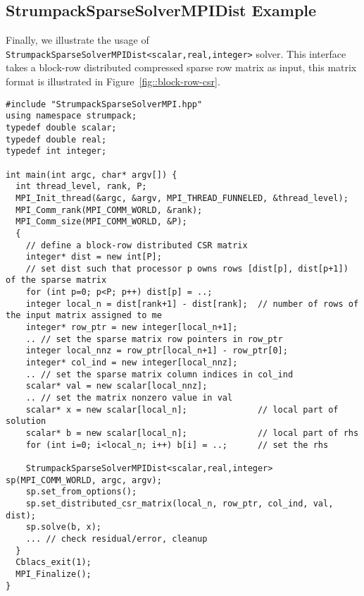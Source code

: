 \documentclass{article}
\begin{document}
\subsection{StrumpackSparseSolverMPIDist Example}
Finally, we illustrate the usage of
\lstinline[style=C]!StrumpackSparseSolverMPIDist<scalar,real,integer>!
solver. This interface takes a block-row distributed compressed sparse
row matrix as input, this matrix format is illustrated in
Figure~\ref{fig::block-row-csr}.
\begin{lstlisting}[style=C]
#include "StrumpackSparseSolverMPI.hpp"
using namespace strumpack;
typedef double scalar;
typedef double real;
typedef int integer;

int main(int argc, char* argv[]) {
  int thread_level, rank, P;
  MPI_Init_thread(&argc, &argv, MPI_THREAD_FUNNELED, &thread_level);
  MPI_Comm_rank(MPI_COMM_WORLD, &rank);
  MPI_Comm_size(MPI_COMM_WORLD, &P);
  {
    // define a block-row distributed CSR matrix
    integer* dist = new int[P];
    // set dist such that processor p owns rows [dist[p], dist[p+1]) of the sparse matrix
    for (int p=0; p<P; p++) dist[p] = ..;
    integer local_n = dist[rank+1] - dist[rank];  // number of rows of the input matrix assigned to me
    integer* row_ptr = new integer[local_n+1];
    .. // set the sparse matrix row pointers in row_ptr
    integer local_nnz = row_ptr[local_n+1] - row_ptr[0];
    integer* col_ind = new integer[local_nnz];
    .. // set the sparse matrix column indices in col_ind
    scalar* val = new scalar[local_nnz];
    .. // set the matrix nonzero value in val
    scalar* x = new scalar[local_n];              // local part of solution
    scalar* b = new scalar[local_n];              // local part of rhs
    for (int i=0; i<local_n; i++) b[i] = ..;      // set the rhs

    StrumpackSparseSolverMPIDist<scalar,real,integer> sp(MPI_COMM_WORLD, argc, argv);
    sp.set_from_options();
    sp.set_distributed_csr_matrix(local_n, row_ptr, col_ind, val, dist);
    sp.solve(b, x);
    ... // check residual/error, cleanup
  }
  Cblacs_exit(1);
  MPI_Finalize();
}
\end{lstlisting}
\end{document}
